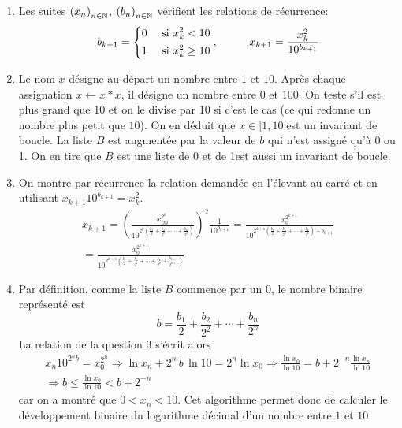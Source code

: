 \begin{enumerate}
  \item Les suites $\left( x_n\right)_{n\in \mathbb{N}}$, $\left( b_n\right)_{n\in \mathbb{N}}$ vérifient les relations de récurrence:
\begin{displaymath}
b_{k+1} =
\left\lbrace 
\begin{aligned}
  &0 &\text{ si } x_k^2 < 10 \\
  &1 &\text{ si } x_k^2 \geq 10
\end{aligned}
\right., \\
\hspace{1cm} x_{k+1} = \frac{x_k^2}{10^{b_{k+1}}}
\end{displaymath}

\item Le nom $x$ désigne au départ un nombre entre $1$ et $10$. Après chaque assignation $x \leftarrow x *x$, il désigne un nombre entre $0$ et $100$. On teste s'il est plus grand que 10 et on le divise par 10 si c'est le cas (ce qui redonne un nombre plus petit que $10$). On en déduit que \og $x\in [1,10[$\fg est un invariant de boucle.\newline
La liste $B$ est augmentée par la valeur de $b$ qui n'est assigné qu'à 0 ou 1. On en tire que \og$B$ est une liste de 0 et de 1\fg est aussi un invariant de boucle. 

\item On montre par récurrence la relation demandée en l'élevant au carré et en utilisant $x_{k+1}10^{b_{k+1}}=x_k^{2}$.
\begin{multline*}
  x_{k+1} = 
\left( 
\frac{x_{ini}^{2^k}}{10^{2^{k}\left(\frac{b_1}{2}+\frac{b_2}{2^2}+\cdots+ \frac{b_k}{2^k}\right) }}
\right)^2 \frac{1}{10^{b_{k+1}}}
=
\frac{x_{0}^{2^{k+1}}}{10^{2^{k+1}\left(\frac{b_1}{2}+\frac{b_2}{2^2}+\cdots+ \frac{b_k}{2^k}\right) +b_{k+1}}}\\
=
\frac{x_{0}^{2^{k+1}}}{10^{2^{k+1}\left(\frac{b_1}{2}+\frac{b_2}{2^2}+\cdots+ \frac{b_k}{2^k} + \frac{b_{k+1}}{2^{k+1}}\right) }}
\end{multline*}

\item Par définition, comme la liste $B$ commence par un $0$, le nombre binaire représenté est
\begin{displaymath}
  b = \frac{b_1}{2}+\frac{b_2}{2^2}+\cdots+ \frac{b_n}{2^n}
\end{displaymath}
La relation de la question 3 s'écrit alors
\begin{multline*}
x_n 10^{2^nb} = x_0^{2^{n}}
\Rightarrow
\ln x_n + 2^n\,b\,\ln 10 = 2^n \ln x_0
\Rightarrow
\frac{\ln x_0}{\ln 10} = b + 2^{-n}\frac{\ln x_n}{\ln 10}\\
\Rightarrow
b \leq \frac{\ln x_0}{\ln 10} < b + 2^{-n}
\end{multline*}
car on a montré que $0<x_n<10$. Cet algorithme permet donc de calculer le développement binaire du logarithme décimal d'un nombre entre $1$ et $10$.
\end{enumerate}
